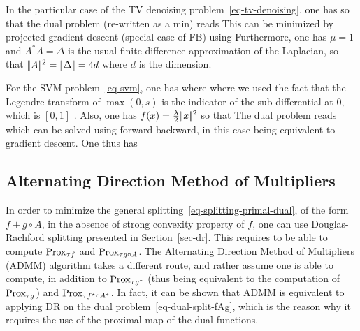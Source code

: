 \begin{exmp}[TV denoising]
In the particular case of the TV denoising problem~\eqref{eq-tv-denoising}, one has
so that the dual problem (re-written as a min) reads
This can be minimized by projected gradient descent (special case of FB) using
Furthermore, one has $\mu=1$ and $A^*A=\Delta$ is the usual finite difference approximation of the Laplacian, so that $|\!| A |\!|^2=|\!| \Delta |\!|=4d$ where $d$ is the dimension.
\end{exmp}


\begin{exmp}
	For the SVM problem~\eqref{eq-svm}, one has 
	where 
	where we used the fact that the Legendre transform of $\max(0,s)$ is the indicator of the sub-differential at 0, which is $[0,1]$ .
	Also, one has $f(x) = \frac{\lambda}{2}|\!| x |\!|^2$
	so that 
	The dual problem reads
	which can be solved using forward backward, in this case being equivalent to gradient descent. 
	One thus has 
\end{exmp}


\subsection{Alternating Direction Method of Multipliers}

In order to minimize the general splitting~\eqref{eq-splitting-primal-dual}, of the form $f + g \circ A$,  in the absence of strong convexity property of $f$, one can use Douglas-Rachford splitting presented in Section~\ref{sec-dr}. This requires to be able to compute $\operatorname{Prox}_{\tau f}$ and $\operatorname{Prox}_{\tau g \circ A}$.
%
The Alternating Direction Method of Multipliers (ADMM) algorithm takes a different route, and rather assume one is able to compute, in addition to $\operatorname{Prox}_{\tau g^*}$ (thus being equivalent to the computation of $\operatorname{Prox}_{\tau g}$) and $\operatorname{Prox}_{\tau f^\star\circ A^*}$. In fact, it can be shown that ADMM is equivalent to applying DR on the dual problem~\eqref{eq-dual-split-fAg}, which is the reason why it requires the use of the proximal map of the dual functions. 

